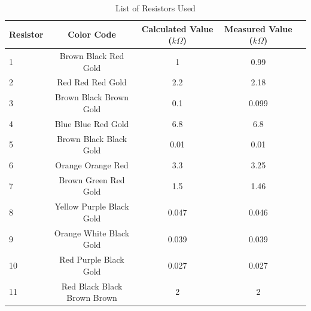\documentclass{article}
\begin{document}
      \begin{table}[!ht]
  \captionsetup{font=large}
  \centering
  \caption{ List of Resistors Used }
  \label{tab: resultResistors }
  \begin{tabular}{   | l | c | c | c | r | }
  \hline

      Resistor &     Color Code &     Calculated Value ($ k \Omega $) &     Measured Value ($ k \Omega $)     \\ \hline
      1 &    Brown Black Red Gold &     1 &     0.99     \\ \hline
      2 &    Red Red Red Gold &     2.2 &     2.18     \\ \hline
      3 &    Brown Black Brown Gold &     0.1 &     0.099     \\ \hline
      4 &    Blue Blue Red Gold &     6.8 &    6.8     \\ \hline
      5 &    Brown Black Black Gold &     0.01 &     0.01     \\ \hline
      6 &    Orange Orange Red &     3.3 &    3.25     \\ \hline
      7 &    Brown Green Red Gold &     1.5 &    1.46     \\ \hline
      8 &    Yellow Purple Black Gold &     0.047 &     0.046     \\ \hline
      9 &    Orange White Black Gold &     0.039 &     0.039     \\ \hline
      10 &    Red Purple Black Gold &     0.027 &     0.027     \\ \hline
      11 &    Red Black Black Brown Brown &     2 &     2      \\ \hline
  
  \end{tabular}
  \end{table}
\end{document}
